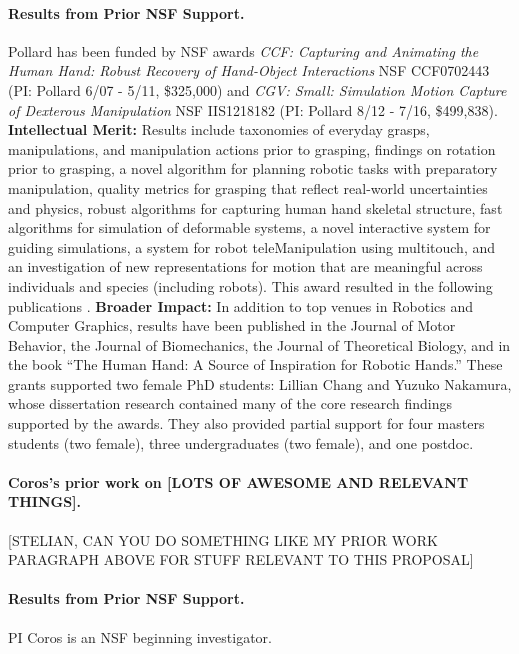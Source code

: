 \paragraph{Results from Prior NSF Support.}
Pollard has been funded by NSF awards \emph{CCF: Capturing and Animating the Human Hand: Robust Recovery of Hand-Object Interactions} NSF CCF0702443 (PI:  Pollard  6/07 - 5/11, \$325,000)  and \emph{CGV: Small: Simulation Motion Capture of Dexterous Manipulation} NSF IIS1218182 (PI:  Pollard  8/12 - 7/16, \$499,838).
{\bf Intellectual Merit:}  Results include taxonomies of everyday grasps, manipulations, and manipulation actions prior to grasping, findings on rotation prior to grasping, a novel algorithm for planning robotic tasks with preparatory manipulation, quality metrics for grasping that reflect real-world uncertainties and physics, robust
algorithms for capturing human hand skeletal structure, fast algorithms for simulation of deformable systems, a novel interactive system for guiding
simulations, a system for robot teleManipulation using multitouch, and an investigation of new
representations for motion that are meaningful across 
individuals and species (including robots).  This award resulted in the following
publications
\cite{liu2016annotating,chung2015quadratic,Liu2014,illing2014changing,kim2013physically,Toh:2012,Chang:2014,Gatesy:2011,Kappler:2012,Kim:ToG11,Kim:CGA11,Koonjul:ICRA11,Chang:JMB10,Chang:ICRA10,Kappler:Humanoids10,Chang:2009,Chang:twoAxis08,Chang:Humanoids08}.
{\bf Broader Impact:}  In addition to top venues in Robotics and Computer Graphics, results
have been published in the Journal of Motor Behavior, the Journal of
Biomechanics, the Journal of Theoretical Biology, and
in the book ``The Human Hand: A Source of Inspiration for
Robotic Hands.''  These grants supported two female PhD students: Lillian Chang and Yuzuko Nakamura,
whose dissertation research contained many of the core research findings
supported by the awards.  They also provided partial support for four masters students (two female), three undergraduates (two female),
and one postdoc.


\paragraph{Coros's prior work on [LOTS OF AWESOME AND RELEVANT THINGS].} 

[STELIAN, CAN YOU DO SOMETHING LIKE MY PRIOR WORK PARAGRAPH ABOVE FOR STUFF RELEVANT TO THIS PROPOSAL]

\paragraph{Results from Prior NSF Support.}
PI Coros is an NSF beginning investigator.